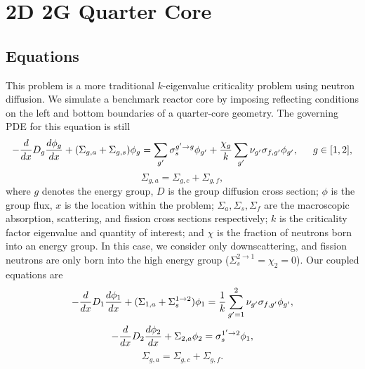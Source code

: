 \section{2D 2G Quarter Core}
\subsection{Equations}
This problem is a more traditional $k$-eigenvalue criticality problem using neutron diffusion.  We simulate a benchmark reactor core by imposing reflecting conditions on the left and bottom boundaries of a quarter-core geometry.  The governing PDE for this equation is still
\begin{equation}
-\frac{d }{d x}D_g\frac{d \phi_g}{d x}+(\Sigma_{g,a}+\Sigma_{g,s})\phi_g = \sum_{g'}\sigma_{s}^{g'\to g}\phi_{g'} + \frac{\chi_{g}}{k}\sum_{g'}\nu_{g'}\sigma_{f,g'}\phi_{g'},\hspace{15pt} g\in[1,2],
\end{equation}
\begin{equation}
\Sigma_{g,a}=\Sigma_{g,c}+\Sigma_{g,f},
\end{equation}
where $g$ denotes the energy group, $D$ is the group diffusion cross section; $\phi$ is the group flux, $x$ is the location within the problem; $\Sigma_a,\Sigma_s,\Sigma_f$ are the macroscopic absorption, scattering, and fission cross sections respectively; $k$ is the criticality factor eigenvalue and quantity of interest; and $\chi$ is the fraction of neutrons born into an energy group.  In this case, we consider only downscattering, and fission neutrons are only born into the high energy group ($\Sigma_s^{2\to1}=\chi_2=0$).  Our coupled equations are
\begin{equation}
-\frac{d }{d x}D_1\frac{d \phi_1}{d x}+(\Sigma_{1,a}+\Sigma_s^{1\to2})\phi_1 = \frac{1}{k}\sum_{g'=1}^2\nu_{g'}\sigma_{f,g'}\phi_{g'},
\end{equation}
\begin{equation}
-\frac{d }{d x}D_2\frac{d \phi_2}{d x}+\Sigma_{2,a}\phi_2 = \sigma_{s}^{1'\to 2}\phi_1,
\end{equation}
\begin{equation}
\Sigma_{g,a}=\Sigma_{g,c}+\Sigma_{g,f}.
\end{equation}

